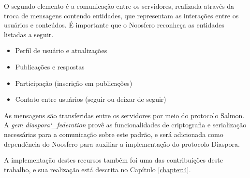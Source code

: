 O segundo elemento é a comunicação entre os servidores, realizada através da troca
de mensagens contendo entidades, que representam as interações entre os usuários e
conteúdos. É importante que o Noosfero reconheça as entidades listadas a seguir.

\begin{itemize}
  \item{Perfil de usuário e atualizações}
  \item{Publicações e respostas}
  \item{Participação (inscrição em publicações)}
  \item{Contato entre usuários (seguir ou deixar de seguir)}
\end{itemize}

As mensagens são transferidas entre os servidores por meio do protocolo Salmon. A
\textit{gem diaspora\char`_federation} provê as funcionalidades de criptografia e
serialização necessárias para a comunicação sobre este padrão, e será adicionada
como dependência do Noosfero para auxiliar a implementação do protocolo Diaspora.

A implementação destes recursos também foi uma das contribuições deste trabalho, e
sua realização está descrita no Capítulo \ref{chapter:4}.
